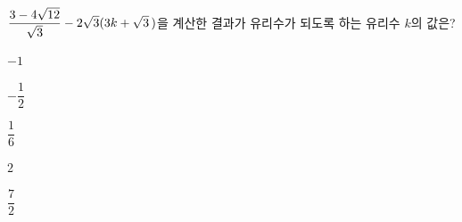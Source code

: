 $\dfrac{3-4\sqrt{12}}{\sqrt{3}}-2\sqrt{3}(3k+\sqrt{3}\mkern3mu )$을 계산한 결과가 유리수가 되도록 하는 유리수 $k$의 값은?
\begin{choices32}{\rule[-3ex]{0pt}{8ex}$-1$}{\rule[-3ex]{0pt}{8ex}$-\dfrac{1}{2}$}{\rule[-3ex]{0pt}{8ex}$\dfrac{1}{6}$}{\rule[-3ex]{0pt}{8ex}$2$}{\rule[-3ex]{0pt}{8ex}$\dfrac{7}{2}$}\end{choices32}
